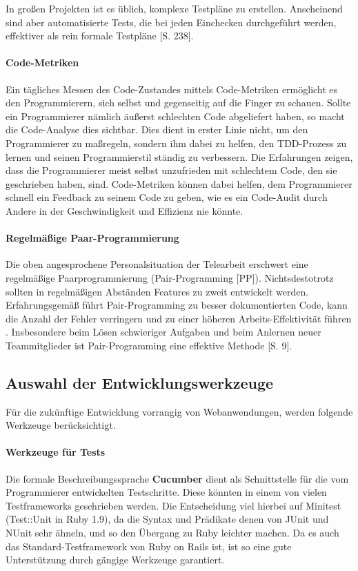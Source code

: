 In großen Projekten ist es üblich, komplexe Testpläne zu erstellen. Anscheinend sind aber automatisierte Tests, die bei jeden Einchecken durchgeführt werden, effektiver als rein formale Testpläne \citep{hunt_pragmatic_1999}[S. 238].

\paragraph{Code-Metriken} Ein tägliches Messen des Code-Zustandes mittels Code-Metriken ermöglicht es den Programmierern, sich selbst und gegenseitig auf die Finger zu schauen. Sollte ein Programmierer nämlich äußerst schlechten Code abgeliefert haben, so macht die Code-Analyse dies sichtbar. Dies dient in erster Linie nicht, um den Programmierer zu maßregeln, sondern ihm dabei zu helfen, den TDD-Prozess zu lernen und seinen Programmierstil ständig zu verbessern. Die Erfahrungen zeigen, dass die Programmierer meist selbst unzufrieden mit schlechtem Code, den sie geschrieben haben, sind. Code-Metriken können dabei helfen, dem Programmierer schnell ein Feedback zu seinem Code zu geben, wie es ein Code-Audit durch Andere in der Geschwindigkeit und Effizienz nie könnte.

\paragraph{Regelmäßige Paar-Programmierung} Die oben angesprochene Personalsituation der Telearbeit erschwert eine regelmäßige Paarprogrammierung (Pair-Programming [PP]). Nichtsdestotrotz sollten in regelmäßigen Abständen Features zu zweit entwickelt werden. Erfahrungsgemäß führt Pair-Programming zu besser dokumentierten Code, kann die Anzahl der Fehler verringern und zu einer höheren Arbeits-Effektivität führen \citep{hulkko_multiple_2005}. Insbesondere beim Lösen schwieriger Aufgaben und beim Anlernen neuer Teammitglieder ist Pair-Programming eine effektive Methode \citep{hulkko_multiple_2005}[S. 9].


\subsection{Auswahl der Entwicklungswerkzeuge}

Für die zukünftige Entwicklung vorrangig von Webanwendungen, werden folgende Werkzeuge berücksichtigt.

\paragraph{Werkzeuge für Tests} Die formale Beschreibungssprache \textbf{Cucumber} dient als Schnittstelle für die vom Programmierer entwickelten Testschritte. Diese könnten in einem von vielen Testframeworks geschrieben werden. Die Entscheidung viel hierbei auf Minitest (Test::Unit in Ruby 1.9), da die Syntax und Prädikate denen von JUnit und NUnit sehr ähneln, und so den Übergang zu Ruby leichter machen. Da es auch das Standard-Testframework von Ruby on Rails ist, ist so eine gute Unterstützung durch gängige Werkzeuge garantiert.

